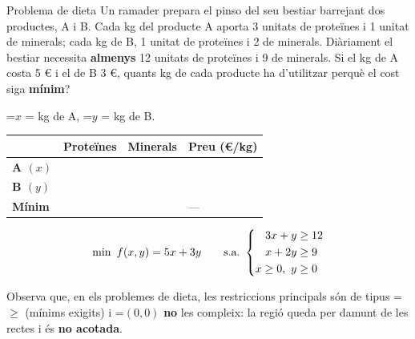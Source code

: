 \documentclass[11pt,a4paper]{article}
\newcommand{\fmm}[1]{\setbox0=\hbox{$#1$}\ifdim\wd0>\linewidth\fmdisp{#1}\else\mbox{\box0}\fi}
\newcommand{\fmdisp}[1]{\[\setbox2=\hbox{$\displaystyle #1$}\ifdim\wd2>\linewidth\resizebox{\linewidth}{!}{\box2}\else\box2\fi\]}
\begin{document}
\begin{fmex}{Problema de dieta}
Un ramader prepara el pinso del seu bestiar barrejant dos productes, A i B. Cada kg del producte A aporta 3 unitats de proteïnes i 1 unitat de minerals; cada kg de B, 1 unitat de proteïnes i 2 de minerals. Diàriament el bestiar necessita \textbf{almenys} 12 unitats de proteïnes i 9 de minerals. Si el kg de A costa 5 € i el de B 3 €, quants kg de cada producte ha d'utilitzar perquè el cost siga \textbf{mínim}?

\fmm{x} = kg de A, \fmm{y} = kg de B.

\begin{center}\renewcommand{\arraystretch}{1.5}\small\begin{tabularx}{\linewidth}{>{\raggedright\arraybackslash}p{3.2cm}>{\raggedright\arraybackslash}X>{\raggedright\arraybackslash}X>{\raggedright\arraybackslash}X}\toprule
\textbf{} & \textbf{Proteïnes} & \textbf{Minerals} & \textbf{Preu (€/kg)}\\\midrule
\textbf{A $(x)$} & 3 & 1 & 5\\[3pt]
\textbf{B $(y)$} & 1 & 2 & 3\\[3pt]
\textbf{Mínim} & 12 & 9 & —\\[3pt]
\bottomrule\end{tabularx}\end{center}

\fmdisp{\min\ f(x,y)=5x+3y\qquad\text{s.a.}\ \left\{\begin{aligned}3x+y&\geq12\\ x+2y&\geq9\\ x\geq0,\ y&\geq0\end{aligned}\right.}

Observa que, en els problemes de dieta, les restriccions principals són de tipus \fmm{\geq} (mínims exigits) i \fmm{(0,0)} \textbf{no} les compleix: la regió queda per damunt de les rectes i és \textbf{no acotada}.


\end{fmex}
\end{document}
